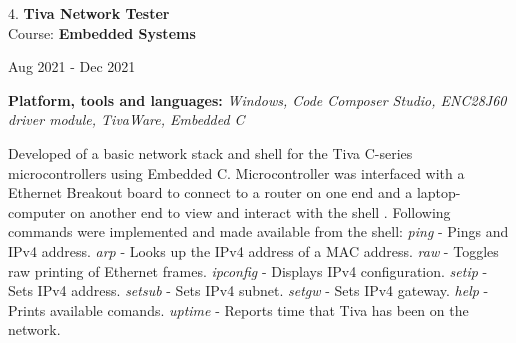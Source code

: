 \documentclass[10pt]{article}
\newenvironment{innerlist}[1][\enskip\textbullet]%
        {\begin{compactitem}[#1]}{\end{compactitem}}
\newenvironment{loneinnerlist}[1][\enskip\textbullet]%
        {\vspace{-\baselineskip}\begin{compactitem}[#1]}
        {\end{compactitem}\vspace{-.6\baselineskip}}
\begin{document}
\begin{loneinnerlist}
\item[4.]\textbf{Tiva Network Tester} \\ 
\vspace{4pt}
Course: \textbf{Embedded Systems} \\
\vspace*{-28pt} \begin{flushright} Aug 2021 - Dec 2021 \end{flushright}
\textbf{Platform, tools and languages:} \emph{Windows, Code Composer Studio, ENC28J60 driver module, TivaWare, Embedded C}
\vspace*{2pt}
\begin{innerlist} \item Developed of a basic network stack and shell for the Tiva C-series microcontrollers using Embedded C. Microcontroller was interfaced with a Ethernet Breakout board to connect to a router on one end and a laptop-computer on another end to view and interact with the shell . Following commands were implemented and made available from the shell:
   \subitem \emph{ping} - Pings and IPv4 address.
   \subitem \emph{arp} - Looks up the IPv4 address of a MAC address.
   \subitem \emph{raw} - Toggles raw printing of Ethernet frames.
   \subitem \emph{ipconfig} - Displays IPv4 configuration.
   \subitem \emph{setip} - Sets IPv4 address.
   \subitem \emph{setsub} - Sets IPv4 subnet.
   \subitem \emph{setgw} - Sets IPv4 gateway.
   \subitem \emph{help} - Prints available comands.
   \subitem \emph{uptime} - Reports time that Tiva has been on the network.
\end{innerlist}  \vspace*{4pt}


\end{loneinnerlist}
\end{document}
